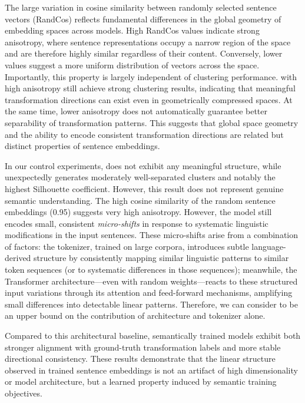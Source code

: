 The large variation in cosine similarity between randomly selected sentence vectors (RandCos) reflects fundamental differences in the global geometry of embedding spaces across models. High RandCos values indicate strong anisotropy, where sentence representations occupy a narrow region of the space and are therefore highly similar regardless of their content. Conversely, lower values suggest a more uniform distribution of vectors across the space. Importantly, this property is largely independent of clustering performance. \elarge with high anisotropy still achieve strong clustering results, indicating that meaningful transformation directions can exist even in geometrically compressed spaces. At the same time, lower anisotropy does not automatically guarantee better separability of transformation patterns. This suggests that global space geometry and the ability to encode consistent transformation directions are related but distinct properties of sentence embeddings.


In our control experiments, \random does not exhibit any meaningful structure, while \enrandombert unexpectedly generates moderately well-separated clusters and notably the highest Silhouette coefficient. However, this result does not represent genuine semantic understanding. The high cosine similarity of the random sentence embeddings (0.95) suggests very high anisotropy. However, the model still encodes small, consistent \textit{micro-shifts} in response to systematic linguistic modifications in the input sentences. These micro-shifts arise from a combination of factors: the tokenizer, trained on large corpora, introduces subtle language-derived structure by consistently mapping similar linguistic patterns to similar token sequences (or to systematic differences in those sequences); meanwhile, the Transformer architecture—even with random weights—reacts to these structured input variations through its attention and feed-forward mechanisms, amplifying small differences into detectable linear patterns. Therefore, we can consider \enrandombert to be an upper bound on the contribution of architecture and tokenizer alone. 

Compared to this architectural baseline, semantically trained models exhibit both stronger alignment with ground-truth transformation labels and more stable directional consistency. These results demonstrate that the linear structure observed in trained sentence embeddings is not an artifact of high dimensionality or model architecture, but a learned property induced by semantic training objectives.

